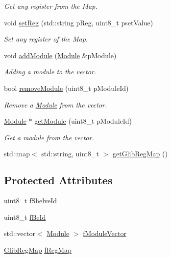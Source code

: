 \begin{DoxyCompactItemize}
\begin{DoxyCompactList}\small\item\em Get any register from the Map. \end{DoxyCompactList}\item 
void \hyperlink{class_ph2___hw_description_1_1_glib_a017ab68372401fe244b912a5297b0c33}{set\-Reg} (std\-::string p\-Reg, uint8\-\_\-t pset\-Value)
\begin{DoxyCompactList}\small\item\em Set any register of the Map. \end{DoxyCompactList}\item 
void \hyperlink{class_ph2___hw_description_1_1_glib_a1bbf1eb3a5d4efca9801d2eaca6f33f7}{add\-Module} (\hyperlink{class_ph2___hw_description_1_1_module}{Module} \&p\-Module)
\begin{DoxyCompactList}\small\item\em Adding a module to the vector. \end{DoxyCompactList}\item 
bool \hyperlink{class_ph2___hw_description_1_1_glib_a64d98cba80674893dff1a91c69b0f34e}{remove\-Module} (uint8\-\_\-t p\-Module\-Id)
\begin{DoxyCompactList}\small\item\em Remove a \hyperlink{class_ph2___hw_description_1_1_module}{Module} from the vector. \end{DoxyCompactList}\item 
\hyperlink{class_ph2___hw_description_1_1_module}{Module} $\ast$ \hyperlink{class_ph2___hw_description_1_1_glib_a41e024e9138acdcb856c0f5c8c43be43}{get\-Module} (uint8\-\_\-t p\-Module\-Id)
\begin{DoxyCompactList}\small\item\em Get a module from the vector. \end{DoxyCompactList}\item 
std\-::map$<$ std\-::string, uint8\-\_\-t $>$ \hyperlink{class_ph2___hw_description_1_1_glib_a971d4ea45771b8f93ca81bc794613262}{get\-Glib\-Reg\-Map} ()
\end{DoxyCompactItemize}
\subsection*{Protected Attributes}
\begin{DoxyCompactItemize}
\item 
uint8\-\_\-t \hyperlink{class_ph2___hw_description_1_1_glib_abcaa5b1cb716d3aa814688dd5691a421}{f\-Shelve\-Id}
\item 
uint8\-\_\-t \hyperlink{class_ph2___hw_description_1_1_glib_ac89e9a9eee11e41f901e90c619e50bfc}{f\-Be\-Id}
\item 
std\-::vector$<$ \hyperlink{class_ph2___hw_description_1_1_module}{Module} $>$ \hyperlink{class_ph2___hw_description_1_1_glib_a97b6535900b4fa8eef81c7e15a01cda4}{f\-Module\-Vector}
\item 
\hyperlink{namespace_ph2___hw_description_afc0e75a92548c3406e89bf39ca4c9bfb}{Glib\-Reg\-Map} \hyperlink{class_ph2___hw_description_1_1_glib_a1a0c6dba5a24c615e8609b03012a8970}{f\-Reg\-Map}
\end{DoxyCompactItemize}
